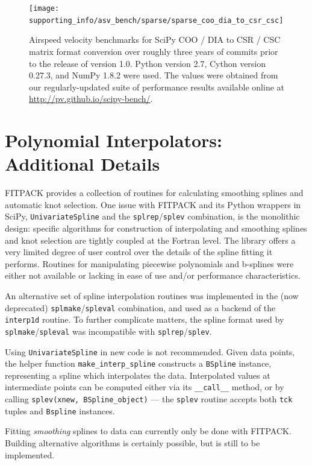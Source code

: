 \documentclass[fleqn,10pt]{wlscirep}
\newcommand{\code}[1]{\texttt{#1}}
\begin{document}
\begin{figure}[H]
\centering
\texttt{[image: supporting\_info/asv\_bench/sparse/sparse\_coo\_dia\_to\_csr\_csc]}
\caption{Airspeed velocity benchmarks for SciPy COO / DIA to CSR / CSC matrix format conversion over roughly three years of commits prior to the release of version 1.0. Python version 2.7, Cython version 0.27.3, and NumPy 1.8.2 were used. The values were obtained from our regularly-updated suite of performance results available online at \url{http://pv.github.io/scipy-bench/}.}
\label{fig:sparse-conv}
\end{figure}

\section{Polynomial Interpolators: Additional Details}
FITPACK provides a collection of routines for calculating
smoothing splines and automatic knot selection. One issue 
with FITPACK and its Python wrappers in SciPy, \code{UnivariateSpline}
and the \code{splrep}/\code{splev} combination, is the monolithic design:
specific algorithms for construction of interpolating and 
smoothing splines and knot selection are tightly coupled 
at the Fortran level. The library offers a very
limited degree of user control over the details 
of the spline fitting it performs. 
%
Routines for manipulating piecewise polynomials and b-splines were either
not available or lacking in ease of use and/or performance characteristics.

An alternative set of spline interpolation routines was implemented in the
(now deprecated) \code{splmake}/\code{spleval} combination, and used as a
backend of the \code{interp1d} routine. To further complicate matters,
the spline format used by \code{splmake}/\code{spleval} was incompatible 
with \code{splrep}/\code{splev}.

Using \code{UnivariateSpline} in new code is not recommended. Given data points,
the helper function \code{make\_interp\_spline} constructs a \code{BSpline}
instance, representing a spline which interpolates the data. Interpolated values
at intermediate points can be computed either via its \code{\_\_call\_\_} method,
or by calling \code{splev(xnew, BSpline\_object)} --- the \code{splev} routine
accepts both \code{tck} tuples and \code{Bspline} instances.

Fitting \emph{smoothing} splines to data can currently only be done with 
FITPACK. Building alternative algorithms is certainly possible,
but is still to be implemented.
\end{document}

